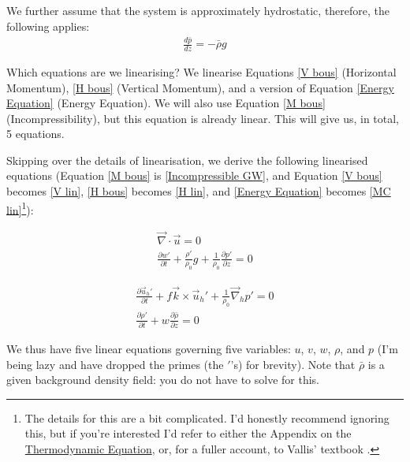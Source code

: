 \vspace{2mm} We further assume that the system is approximately hydrostatic, therefore, the following applies:
\begin{align*}
    \frac{d\bar{p}}{dz}=-\bar{\rho}g
\end{align*}

Which equations are we linearising? We linearise Equations \ref{V bous} (Horizontal Momentum), \ref{H bous} (Vertical Momentum), and a version of Equation \ref{Energy Equation} (Energy Equation). We will also use Equation \ref{M bous} (Incompressibility), but this equation is already linear. This will give us, in total, 5 equations.

Skipping over the details of linearisation, we derive the following linearised equations (Equation \ref{M bous} is \ref{Incompressible GW}, and Equation \ref{V bous} becomes \ref{V lin}, \ref{H bous} becomes \ref{H lin}, and \ref{Energy Equation} becomes \ref{MC lin}\footnote{
    The details for this are a bit complicated. I'd honestly recommend ignoring this, but if you're interested I'd refer to either the Appendix on the \hyperref[Appendix Thermodynamic Eqn]{Thermodynamic Equation}, or, for a fuller account, to Vallis' textbook \cite{Vallis}.
 }):

\vspace{-3mm}
\begin{minipage}{0.48\linewidth}
    \begin{align}
        \label{Incompressible GW}
        \boxed{\vec{\nabla}\cdot\vec{u}=0}
        \\
        \label{V lin}
        \boxed{\frac{\partial w'}{\partial t} + \frac{\rho'}{\rho_0} g +\frac{1}{\rho_0}\frac{\partial p'}{\partial z}=0}
    \end{align}
\end{minipage}
\hfill
\begin{minipage}{0.48\linewidth}
    \begin{align}
        \label{H lin}
        \boxed{\frac{\partial \vec{u}_h'}{\partial t}+f\vec{k}\times\vec{u}_h' +\frac{1}{\rho_0}\vec{\nabla}_h p' =0}
        \\
        \label{MC lin}
        \boxed{\frac{\partial \rho'}{\partial t} + w \frac{\partial \bar{\rho}}{\partial z}=0}
    \end{align}
\end{minipage}

\vspace{2mm} We thus have five linear equations governing five variables: \(u\), \(v\), \(w\), \(\rho\), and \(p\) (I'm being lazy and have dropped the primes (the \('\)'s) for brevity). Note that \(\bar{\rho}\) is a given background density field: you do not have to solve for this.

